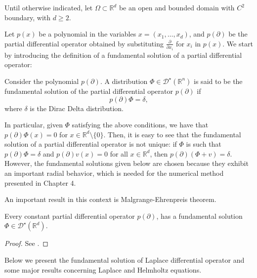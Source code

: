 \label{chap:back}

Until otherwise indicated, let \(\Omega \subset \mathbb{R}^d\) be an open and bounded domain with \(C^2\) boundary, with $d \geq 2$.

Let \(p(x)\) be a polynomial in the variables \(x=(x_1,\dots,x_d)\), and \(p(\partial)\) be the partial differential operator obtained by substituting \(\frac{\partial}{\partial x_i}\) for \(x_i\) in \(p(x)\). We start by introducing the definition of a fundamental solution of a partial differential operator:

\begin{definition}
    Consider the polynomial \(p(\partial)\). A distribution \(\Phi \in \mathcal{D}^\star(\mathbb{R}^n)\) is said to be the fundamental solution of the partial differential operator \(p(\partial)\) if
    \[
        p(\partial) \Phi = \delta,
    \]
    where \(\delta\) is the Dirac Delta distribution.
\end{definition}

In particular, given \(\Phi\) satisfying the above conditions, we have that \(p(\partial)\Phi(x) = 0\) for \(x \in \mathbb{R}^d\setminus \{0\}\). Then, it is easy to see that the fundamental solution of a partial differential operator is not unique: if \(\Phi\) is such that \(p(\partial) \Phi = \delta\) and \(p(\partial) v(x) = 0\) for all \(x \in \mathbb{R}^d\), then \(p(\partial) (\Phi + v) = \delta\). However, the fundamental solutions given below are chosen because they exhibit an important radial behavior, which is needed for the numerical method presented in Chapter 4.

An important result in this context is Malgrange-Ehrenpreis theorem.

\begin{theorem}\label{malgrange-ehrenpreis}
    Every constant partial differential operator $p(\partial)$, has a fundamental solution $\Phi \in \mathcal{D}^\star(\mathbb{R}^d)$.
\end{theorem}
\begin{proof}
    See \cite{reed1975ii}.
\end{proof}
Below we present the fundamental solution of Laplace differential operator and some major results concerning Laplace and Helmholtz equations. 

